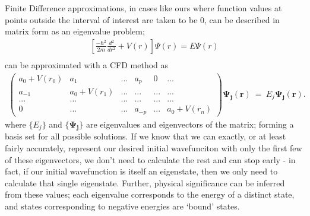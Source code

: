 Finite Difference approximations, in cases like ours where function values at points outside the interval of interest are taken to be $0$, can be described in matrix form as an eigenvalue problem; 
\begin{align*}
    \left[\frac{-\hbar^{2}}{2m}\frac{d^2}{dr^2} + V\left(r\right)\right] \Psi\left(r\right) = E\Psi\left(r\right)\\
\end{align*}
can be approximated with a CFD method as
\begin{align*}
    \begin{pmatrix}
        a_{0}+V\left(r_{0}\right)&a_{1}&...&a_{p}&0&...\\
        a_{-1}&a_{0}+V\left(r_{1}\right)&...&...&...&...\\
        ...&...&...&...&...&...\\
        0&...&...&a_{-p}&...&a_{0}+V\left(r_{n}\right)
    \end{pmatrix}\mathbf{\Psi_{j}\left(r\right)}\ =\ E_{j}\mathbf{\Psi_{j}\left(r\right)}.
\end{align*}
where $\{E_{j}\}$ and $\{\mathbf{\Psi_{j}}\}$ are eigenvalues and eigenvectors of the matrix; forming a basis set for all possible solutions. If we know that we can exactly, or at least fairly accurately, represent our desired initial wavefunciton with only the first few of these eigenvectors, we don't need to calculate the rest and can stop early - in fact, if our initial wavefunction is itself an eigenstate, then we only need to calculate that single eigenstate. Further, physical significance can be inferred from these values; each eigenvalue corresponds to the energy of a distinct state, and states corresponding to negative energies are `bound' states.

